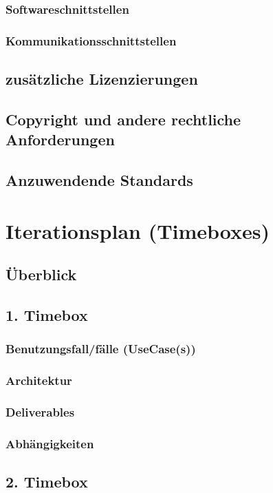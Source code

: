 \documentclass[a4paper,12pt,twoside]{scrreprt}
\begin{document}
    \subsection{Softwareschnittstellen}
    \subsection{Kommunikationsschnittstellen}
    \section{zusätzliche Lizenzierungen}
    \section{Copyright und andere rechtliche Anforderungen}
    \section{Anzuwendende Standards}

    \chapter{Iterationsplan (Timeboxes)}
    \section{Überblick}
    \section{1. Timebox}
    \subsection{Benutzungsfall/fälle (UseCase(s))  }
    \subsection{Architektur}
    \subsection{Deliverables}
    \subsection{Abhängigkeiten}

    \section{2. Timebox}
\end{document}
